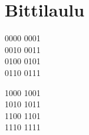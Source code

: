 \section{Bittilaulu}
0000 0001\\
0010 0011\\
0100 0101\\
0110 0111

1000 1001\\
1010 1011\\
1100 1101\\
1110 1111